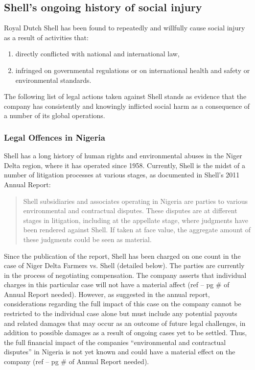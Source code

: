 	\subsection{Shell's ongoing history of social injury}



Royal Dutch Shell has been found to repeatedly and willfully cause social injury as a result of activities that:
\begin{enumerate}
	\item directly conflicted with national and international law,
	\item infringed on governmental regulations or on international health and safety or environmental standards. 
\end{enumerate}
The following list of legal actions taken against Shell stands as evidence that the company has consistently and knowingly inflicted social harm as a consequence of a number of its global operations.



	\subsubsection{Legal Offences in Nigeria}



Shell has a long history of human rights and environmental abuses in the Niger Delta region, where it has operated since 1958.
Currently, Shell is the midst of a number of litigation processes at various stages, as documented in Shell’s 2011 Annual Report:
\begin{quote}
Shell subsidiaries and associates operating in Nigeria are parties to various environmental and contractual disputes.
These disputes are at different stages in litigation, including at the appellate stage, where judgments have been rendered against Shell. 
If taken at face value, the aggregate amount of these judgments could be seen as material.
\end{quote}
Since the publication of the report, Shell has been charged on one count in the case of Niger Delta Farmers vs. Shell (detailed below). 
The parties are currently in the process of negotiating compensation. 
The company asserts that individual charges in this particular case will not have a material affect (ref – pg \# of Annual Report needed). 
However, as suggested in the annual report, considerations regarding the full impact of this case on the company cannot be restricted to the individual case alone but must include any potential payouts and related damages that may occur as an outcome of future legal challenges, in addition to possible damages as a result of ongoing cases yet to be settled. 
Thus, the full financial impact of the companies ``environmental and contractual disputes'' in Nigeria is not yet known and could have a material effect on the company (ref – pg \# of Annual Report needed).



